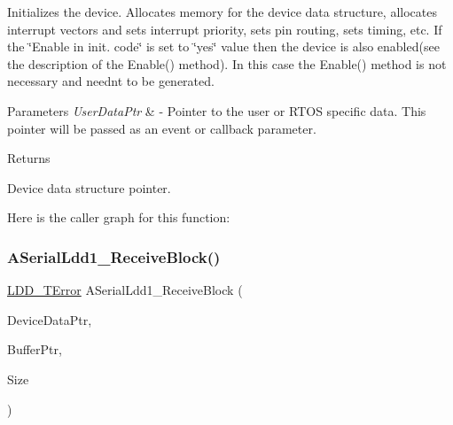 Initializes the device. Allocates memory for the device data structure, allocates interrupt vectors and sets interrupt priority, sets pin routing, sets timing, etc. If the \char`\"{}\+Enable
    in init. code\char`\"{} is set to \char`\"{}yes\char`\"{} value then the device is also enabled(see the description of the Enable() method). In this case the Enable() method is not necessary and needn\textquotesingle{}t to be generated. 


\begin{DoxyParams}{Parameters}
{\em User\+Data\+Ptr} & -\/ Pointer to the user or R\+T\+OS specific data. This pointer will be passed as an event or callback parameter. \\
\hline
\end{DoxyParams}
\begin{DoxyReturn}{Returns}

\begin{DoxyItemize}
\item Device data structure pointer. 
\end{DoxyItemize}
\end{DoxyReturn}
Here is the caller graph for this function\+:
\mbox{\label{group___a_serial_ldd1__module_gad445e8cc518c6e88fc212bd6d4e06490}} 
\subsubsection{\texorpdfstring{A\+Serial\+Ldd1\+\_\+\+Receive\+Block()}{ASerialLdd1\_ReceiveBlock()}}
{\footnotesize\ttfamily \hyperlink{group___p_e___types__module_ga24c2b045fd04e79e85f261ce4df35588}{L\+D\+D\+\_\+\+T\+Error} A\+Serial\+Ldd1\+\_\+\+Receive\+Block (\begin{DoxyParamCaption}\item[{\hyperlink{group___p_e___types__module_gac5cf1362f1f0e3a2ce71b1bf2276d091}{L\+D\+D\+\_\+\+T\+Device\+Data} $\ast$}]{Device\+Data\+Ptr,  }\item[{\hyperlink{group___p_e___types__module_gade8ef9401405bd941b6da738b807f980}{L\+D\+D\+\_\+\+T\+Data} $\ast$}]{Buffer\+Ptr,  }\item[{uint16\+\_\+t}]{Size }\end{DoxyParamCaption})}




